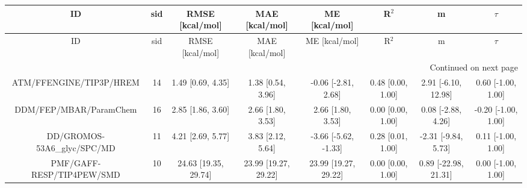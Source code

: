 \documentclass[8pt]{article}
\begin{document}
\begin{center}
\begin{footnotesize}
\begin{longtable}{|cccccccc|}
\toprule
                         ID & sid &      RMSE [kcal/mol] &       MAE [kcal/mol] &        ME [kcal/mol] &             R$^2$ &                    m &              $\tau$ \\
\midrule
\endfirsthead

\toprule
                         ID & sid &      RMSE [kcal/mol] &       MAE [kcal/mol] &        ME [kcal/mol] &             R$^2$ &                    m &              $\tau$ \\
\midrule
\endhead
\midrule
\multicolumn{8}{r}{{Continued on next page}} \\
\midrule
\endfoot

\bottomrule
\endlastfoot
    ATM/FFENGINE/TIP3P/HREM &  14 &    1.49 [0.69, 4.35] &    1.38 [0.54, 3.96] &  -0.06 [-2.81, 2.68] & 0.48 [0.00, 1.00] &  2.91 [-6.10, 12.98] &  0.60 [-1.00, 1.00] \\
     DDM/FEP/MBAR/ParamChem &  16 &    2.85 [1.86, 3.60] &    2.66 [1.80, 3.53] &    2.66 [1.80, 3.53] & 0.00 [0.00, 1.00] &   0.08 [-2.88, 4.26] & -0.20 [-1.00, 1.00] \\
DD/GROMOS-53A6\_glyc/SPC/MD &  11 &    4.21 [2.69, 5.77] &    3.83 [2.12, 5.64] & -3.66 [-5.62, -1.33] & 0.28 [0.01, 1.00] &  -2.31 [-9.84, 5.73] &  0.11 [-1.00, 1.00] \\
  PMF/GAFF-RESP/TIP4PEW/SMD &  10 & 24.63 [19.35, 29.74] & 23.99 [19.27, 29.22] & 23.99 [19.27, 29.22] & 0.00 [0.00, 1.00] & 0.89 [-22.98, 21.31] &  0.00 [-1.00, 1.00] \\
\end{longtable}
\end{footnotesize}
\end{center}
\end{document}

